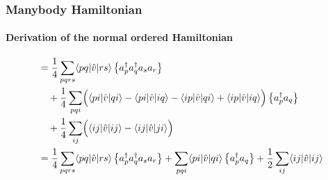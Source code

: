 \begin{frame}[fragile]
    \frametitle{Manybody Hamiltonian}
    \framesubtitle{Derivation of the normal ordered Hamiltonian}

    \begin{align*}
        &= \frac{1}{4} \sum_{pqrs} \langle pq |\hat{v}|rs\rangle \left\{a^\dagger_p a^\dagger_q a_s  a_r\right\} \notag \\
        & \quad + \frac{1}{4} \sum_{pqi} \Bigl(
            \langle pi |\hat{v}|qi\rangle - \langle pi |\hat{v}|iq\rangle - \langle ip |\hat{v}|qi\rangle + \langle ip |\hat{v}|iq\rangle
        \Bigr) \left\{a^\dagger_p a_q\right\} \notag \\
        & \quad + \frac{1}{4} \sum_{ij} \Bigl( 
            \langle ij |\hat{v}|ij\rangle
            - \langle ij |\hat{v}|ji\rangle
        \Bigr) \notag \\
        &= \frac{1}{4} \sum_{pqrs} \langle pq |\hat{v}|rs\rangle \left\{a^\dagger_p a^\dagger_q a_s  a_r\right\}
            + \sum_{pqi} \langle pi |\hat{v}|qi\rangle \left\{a^\dagger_p a_q\right\} 
            + \frac{1}{2} \sum_{ij} \langle ij |\hat{v}|ij\rangle
    \end{align*}


\end{frame}
